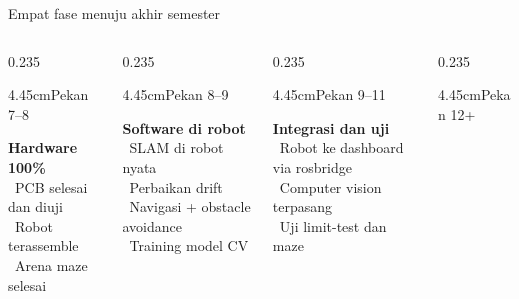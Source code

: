 \documentclass[aspectratio=169,10pt,t]{beamer}
\gdef\currnum{00}
\gdef\currlabel{}
\newcommand{\sect}[2]{\gdef\currnum{#1}\gdef\currlabel{#2}}
\begin{document}
    \sect{08}{Rencana hingga akhir semester}
    \begin{frame}{Empat fase menuju akhir semester}
        \par\vspace{3pt}
        \begin{columns}[T]
            \begin{column}{0.235\textwidth}
                \begin{phase}{4.45cm}{Pekan 7--8}
                    \small\raggedright\textbf{Hardware 100\%}\\[3pt]
                    \textbullet~PCB selesai dan diuji\\\textbullet~Robot terassemble\\\textbullet~Arena maze selesai
                \end{phase}
            \end{column}
            \begin{column}{0.235\textwidth}
                \begin{phase}{4.45cm}{Pekan 8--9}
                    \small\raggedright\textbf{Software di robot}\\[3pt]
                    \textbullet~SLAM di robot nyata\\\textbullet~Perbaikan drift\\\textbullet~Navigasi + obstacle avoidance\\\textbullet~Training model CV
                \end{phase}
            \end{column}
            \begin{column}{0.235\textwidth}
                \begin{phase}{4.45cm}{Pekan 9--11}
                    \small\raggedright\textbf{Integrasi dan uji}\\[3pt]
                    \textbullet~Robot ke dashboard via rosbridge\\\textbullet~Computer vision terpasang\\\textbullet~Uji limit-test dan maze
                \end{phase}
            \end{column}
            \begin{column}{0.235\textwidth}
                \begin{phase}{4.45cm}{Pekan 12+}

\end{phase}
\end{column}
\end{columns}
\end{frame}
\end{document}
